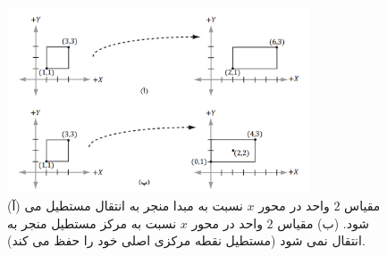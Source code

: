 {\begin{spacing}{1.5}
\begin{enumerate}[label=\textbf{\arabic*}.]
{                \begin{figure}[H]
                    \centering
                    \setlength{\belowcaptionskip}{-10pt}
                    \includegraphics[width=0.8\textwidth]{Images/4/3/4.Session.1.3.18}
                    \caption {(آ) مقیاس $2$ واحد در محور $x$ نسبت به مبدا منجر به انتقال مستطیل می شود.
                        (ب) مقیاس $2$ واحد در محور $x$ نسبت به مرکز مستطیل منجر به انتقال نمی شود (مستطیل نقطه مرکزی اصلی خود را حفظ می کند).}
                    \label{fig:4.Session.1.3.18}
                \end{figure}
            }
        \end{enumerate}
    \end{spacing}
}